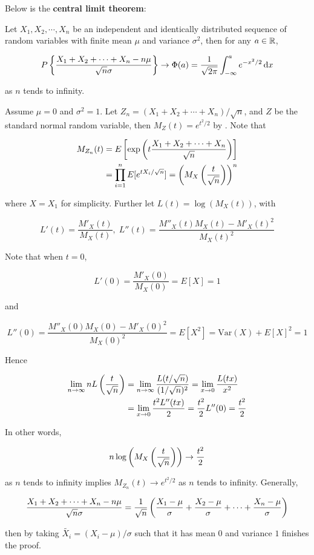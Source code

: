 \documentclass[a4paper,12pt]{article}
\begin{document}
Below is the \textbf{central limit theorem}:\n

\begin{thm}
  Let $X_{1},X_{2},\cdots,X_{n}$ be an independent and identically distributed sequence of random variables with finite mean $\mu$ and variance $\sigma^{2}$, then for any $a\in\mathbb{R}$,

  $$P\left\{ \frac{X_{1}+X_{2}+\cdots+X_{n}-n\mu}{\sqrt{n}\sigma}\right\}\to\Phi(a)=\frac{1}{\sqrt{2\pi}}\int_{-\infty}^{a}e^{-x^{2}/2}\,\mathrm{d} x$$\s

  as $n$ tends to infinity.\n

  \prf Assume $\mu=0$ and $\sigma^{2}=1$. Let $Z_{n}=(X_{1}+X_{2}+\cdots+X_{n})/\sqrt{n}$, and $Z$ be the standard normal random variable, then $M_{Z}(t)=e^{t^{2}/2}$ by \rexm[\sctr{10}]. Note that

  $$\begin{aligned}[t]
    M_{Z_{n}}(t)&=E\left[ \exp\left( t\frac{X_{1}+X_{2}+\cdots+X_{n}}{\sqrt{n}}\right)\right]\\
    &=\prod_{i=1}^{n}E[e^{tX_{i}/\sqrt{n}}]=\left( M_{X}\left( \frac{t}{\sqrt{n}}\right)\right)^{n}
  \end{aligned}$$\s

  where $X=X_{1}$ for simplicity. Further let $L(t)=\log(M_{X}(t))$, with

  $$L'(t)=\frac{M'_{X}(t)}{M_{X}(t)},\;L''(t)=\frac{M''_{X}(t)M_{X}(t)-M'_{X}(t)^{2}}{M_{X}(t)^{2}}$$\s

  Note that when $t=0$,

  $$L'(0)=\frac{M'_{X}(0)}{M_{X}(0)}=E[X]=1$$\s

  and

  $$L''(0)=\frac{M''_{X}(0)M_{X}(0)-M'_{X}(0)^{2}}{M_{X}(0)^{2}}=E[X^{2}]=\mathrm{Var}(X)+E[X]^{2}=1$$\s

  Hence

  $$\begin{aligned}[t]
    \lim_{n\to\infty}nL\left( \frac{t}{\sqrt{n}}\right)&=\lim_{n\to\infty}\frac{L(t/\sqrt{n})}{(1/\sqrt{n})^{2}}=\lim_{x\to 0}\frac{L(tx)}{x^{2}}\\
    &=\lim_{x\to 0}\frac{t^{2}L''(tx)}{2}=\frac{t^{2}}{2}L''(0)=\frac{t^{2}}{2}
  \end{aligned}$$\s

  In other words,

  $$n\log\left( M_{X}\left( \frac{t}{\sqrt{n}}\right)\right)\to\frac{t^{2}}{2}$$\s

  as $n$ tends to infinity implies $M_{Z_{n}}(t)\to e^{t^{2}/2}$ as $n$ tends to infinity. Generally,

  $$\frac{X_{1}+X_{2}+\cdots+X_{n}-n\mu}{\sqrt{n}\sigma}=\frac{1}{\sqrt{n}}\left( \frac{X_{1}-\mu}{\sigma}+\frac{X_{2}-\mu}{\sigma}+\cdots+\frac{X_{n}-\mu}{\sigma}\right)$$\s

  then by taking $\tilde{X_{i}}=(X_{i}-\mu)/\sigma$ such that it has mean $0$ and variance $1$ finishes the proof.
\end{thm}\n
\end{document}
